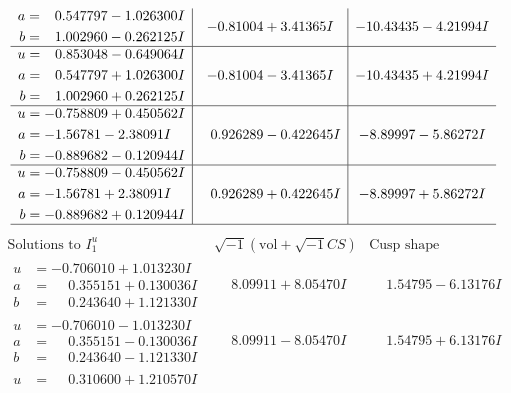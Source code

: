 \documentclass[1p]{elsarticle_modified}
\theoremstyle{definition}
\newcommand{\I}{\sqrt{-1}}
\begin{document}
$$\begin{array}{c|c|c}
\begin{aligned}
a &= \phantom{-}0.547797 - 1.026300 I \\
b &= \phantom{-}1.002960 - 0.262125 I\end{aligned}
 & -0.81004 + 3.41365 I & -10.43435 - 4.21994 I \\ \hline\begin{aligned}
u &= \phantom{-}0.853048 - 0.649064 I \\
a &= \phantom{-}0.547797 + 1.026300 I \\
b &= \phantom{-}1.002960 + 0.262125 I\end{aligned}
 & -0.81004 - 3.41365 I & -10.43435 + 4.21994 I \\ \hline\begin{aligned}
u &= -0.758809 + 0.450562 I \\
a &= -1.56781 - 2.38091 I \\
b &= -0.889682 - 0.120944 I\end{aligned}
 & \phantom{-}0.926289 - 0.422645 I & -8.89997 - 5.86272 I \\ \hline\begin{aligned}
u &= -0.758809 - 0.450562 I \\
a &= -1.56781 + 2.38091 I \\
b &= -0.889682 + 0.120944 I\end{aligned}
 & \phantom{-}0.926289 + 0.422645 I & -8.89997 + 5.86272 I\\
 \hline 
 \end{array}$$\newpage$$\begin{array}{c|c|c}  
\text{Solutions to }I^u_{1}& \I (\text{vol} + \sqrt{-1}CS) & \text{Cusp shape}\\
 \hline 
\begin{aligned}
u &= -0.706010 + 1.013230 I \\
a &= \phantom{-}0.355151 + 0.130036 I \\
b &= \phantom{-}0.243640 + 1.121330 I\end{aligned}
 & \phantom{-}8.09911 + 8.05470 I & \phantom{-}1.54795 - 6.13176 I \\ \hline\begin{aligned}
u &= -0.706010 - 1.013230 I \\
a &= \phantom{-}0.355151 - 0.130036 I \\
b &= \phantom{-}0.243640 - 1.121330 I\end{aligned}
 & \phantom{-}8.09911 - 8.05470 I & \phantom{-}1.54795 + 6.13176 I \\ \hline\begin{aligned}
u &= \phantom{-}0.310600 + 1.210570 I \\

\end{aligned}
\end{array}$$
\end{document}
